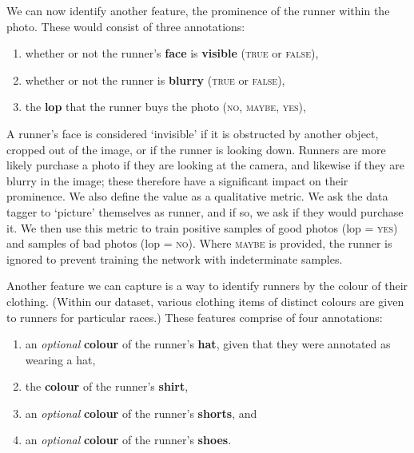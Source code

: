 
%

We can now identify another feature, the prominence of the runner within the photo. These would consist of three annotations:

\begin{enumerate}
  \item whether or not the runner's \textbf{face} is \textbf{visible} (\textsc{true} or \textsc{false}),
  \item whether or not the runner is \textbf{blurry} (\textsc{true} or \textsc{false}),
  \item the \textbf{\gls{lop}} that the runner buys the photo (\textsc{no}, \textsc{maybe}, \textsc{yes}),
\end{enumerate}

A runner's face is considered `invisible' if it is obstructed by another object, cropped out of the image, or if the runner is looking down. Runners are more likely purchase a photo if they are looking at the camera, and likewise if they are blurry in the image; these therefore have a significant impact on their prominence. We also define the  value as a qualitative metric. We ask the data tagger to `picture' themselves as runner, and if so, we ask if they would purchase it. We then use this metric to train positive samples of good photos (\gls{lop} = \textsc{yes}) and samples of bad photos (\gls{lop} = \textsc{no}). Where \textsc{maybe} is provided, the runner is ignored to prevent training the network with indeterminate samples.


Another feature we can capture is a way to identify runners by the colour of their clothing. (Within our dataset, various clothing items of distinct colours are given to runners for particular races.) These features comprise of four annotations:

\begin{enumerate}
  \item an \textit{optional} \textbf{colour} of the runner's \textbf{hat}, given that they were annotated as wearing a hat,
  \item the \textbf{colour} of the runner's \textbf{shirt},
  \item an \textit{optional} \textbf{colour} of the runner's \textbf{shorts}, and
  \item an \textit{optional} \textbf{colour} of the runner's \textbf{shoes}.
\end{enumerate}

